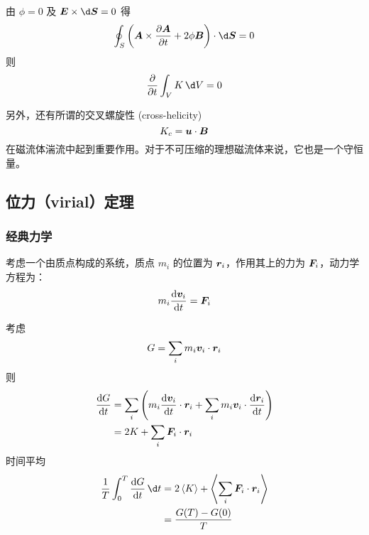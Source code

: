 由 $\phi = 0$ 及 $\vector{E} \times \d \vector{S} = 0$ 得
\begin{equation}
    \oint_S \left(
    \vector{A} \times \pDeriv{\vector{A}}{t} + 2 \phi \vector{B}
\right) \cdot \d \vector{S} = 0
\end{equation}
则
\begin{equation}
    \pDeriv{}{t} \int_V K \, \d V = 0
\end{equation}

另外，还有所谓的交叉螺旋性 (cross-helicity)
\begin{equation}
    K_c = \bm{u} \cdot \bm{B}
\end{equation}
在磁流体湍流中起到重要作用。对于不可压缩的理想磁流体来说，它也是一个守恒量。

\subsection{位力（virial）定理}

\subsubsection{经典力学}

考虑一个由质点构成的系统，质点 $m_i$ 的位置为 $\bm{r}_i$，作用其上的力为 $\bm{F}_i$，动力学方程为：
\begin{equation}
    m_i \frac{\mathop{}\!\mathrm{d} {\bm{v}_i}}{\mathop{}\!\mathrm{d} {t}} = \bm{F}_i
\end{equation}

考虑
\begin{equation}
    G = \sum_i m_i \bm{v}_i \cdot \bm{r}_i
\end{equation}
则
\begin{equation}\begin{aligned}
    \frac{\mathop{}\!\mathrm{d} {G}}{\mathop{}\!\mathrm{d} {t}} &= \sum_i \left( m_i \frac{\mathop{}\!\mathrm{d} {\bm{v}_i}}{\mathop{}\!\mathrm{d} {t}} \cdot \bm{r}_i
    + \sum_i m_i \bm{v}_i \cdot \frac{\mathop{}\!\mathrm{d} {\bm{r}_i}}{\mathop{}\!\mathrm{d} {t}} \right) \\
    &= 2 K + \sum_i \bm{F}_i \cdot \bm{r}_i
\end{aligned}\end{equation}
时间平均
\begin{equation}\begin{aligned}
    \frac{1}{T} \int_0^T \Deriv{G}{t} \, \d t
    &= 2 \left\langle K \right\rangle + \left\langle \sum_i \vector{F}_i \cdot \vector{r}_i \right\rangle \\
    &= \frac{G(T) - G(0)}{T}
\end{aligned}\end{equation}

